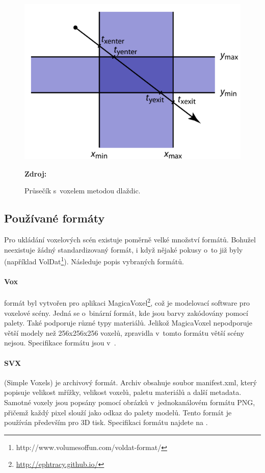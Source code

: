 \begin{figure}[H]
	\centering
	\includegraphics[scale=1.3]{obrazky-figures/slab_intersect.png}
	\caption{Průsečík s~voxelem metodou dlaždic.}
	\textbf{Zdroj: \cite{Cunha13}}
	\label{fig:slabs}
\end{figure}


\subsection{Používané formáty} \label{sec:format}
Pro ukládání voxelových scén existuje poměrně velké množství formátů. Bohužel neexistuje žádný standardizovaný formát, i když nějaké pokusy o~to již byly (například VolDat\footnote{http://www.volumesoffun.com/voldat-format/}). Následuje popis vybraných formátů.

\paragraph{Vox} formát byl vytvořen pro aplikaci MagicaVoxel\footnote{\url{http://ephtracy.github.io/}}, což je modelovací software pro voxelové scény. Jedná se o~binární formát, kde jsou barvy zakódovány pomocí palety. Také podporuje různé typy materiálů. Jelikož MagicaVoxel nepodporuje větší modely než 256x256x256 voxelů, zpravidla v~tomto formátu větší scény nejsou. Specifikace formátu jsou v~\cite{vox_format}.

\paragraph{SVX} (Simple Voxels) je archivový formát. Archiv obsahuje soubor manifest.xml, který popisuje velikost mřížky, velikost voxelů, paletu materiálů a další metadata. Samotné voxely jsou popsány pomocí obrázků v~jednokanálovém formátu PNG, přičemž každý pixel slouží jako odkaz do palety modelů. Tento formát je používán především pro 3D tisk. Specifikaci formátu najdete na \cite{svx_format_2014}.

